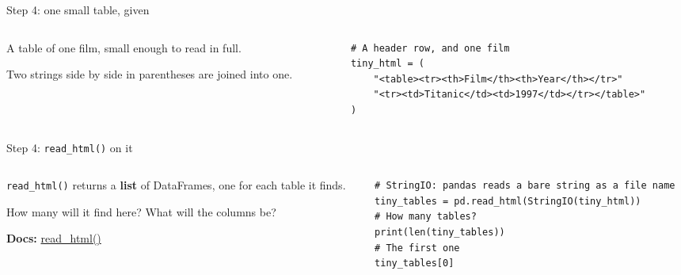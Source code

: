 \documentclass[9pt,aspectratio=169]{beamer}
\begin{document}
\begin{frame}[fragile]{Step 4: one small table, given}
    \begin{columns}[T]
        \begin{column}{0.37\textwidth}
            A table of one film, small enough to read in full.

            \medskip
            Two strings side by side in parentheses are joined into one.
        \end{column}
        \begin{column}{0.6\textwidth}
\begin{lstlisting}
# A header row, and one film
tiny_html = (
    "<table><tr><th>Film</th><th>Year</th></tr>"
    "<tr><td>Titanic</td><td>1997</td></tr></table>"
)
\end{lstlisting}
        \end{column}
    \end{columns}
\end{frame}

\begin{frame}[fragile]{Step 4: \texttt{read\_html()} on it}
    \begin{columns}[T]
        \begin{column}{0.37\textwidth}
            \texttt{read\_html()} returns a \textbf{list} of DataFrames, one for each table it finds.

            \medskip
            How many will it find here? What will the columns be?

            \medskip
            {\scriptsize\textbf{Docs:} \href{https://pandas.pydata.org/docs/reference/api/pandas.read_html.html}{read\_html()}\par}
        \end{column}
        \begin{column}{0.6\textwidth}
\begin{lstlisting}
# StringIO: pandas reads a bare string as a file name
tiny_tables = pd.read_html(StringIO(tiny_html))
# How many tables?
print(len(tiny_tables))
# The first one
tiny_tables[0]
\end{lstlisting}
        \end{column}
    \end{columns}
\end{frame}
\end{document}
